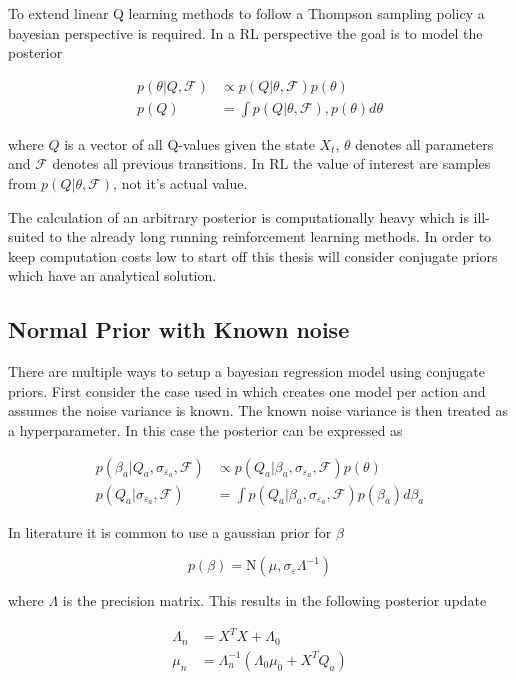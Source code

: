 To extend linear Q learning methods to follow a Thompson sampling policy a bayesian perspective is required. In a RL perspective the goal is to model the posterior

\begin{align*}
p(\theta |Q, \mathcal{F}) &\propto p(Q| \theta, \mathcal{F})p(\theta) \\
p(Q) &= \int p(Q|\theta, \mathcal{F}), p(\theta) d\theta
\end{align*}

where $Q$ is a vector of all Q-values given the state $X_t$, $\theta$ denotes all parameters and $\mathcal{F}$ denotes all previous transitions. In RL the value of interest are samples from $p(Q|\theta, \mathcal{F})$, not it's actual value.

The calculation of an arbitrary posterior is computationally heavy which is ill-suited to the already long running reinforcement learning methods. In order to keep computation costs low to start off this thesis will consider conjugate priors which have an analytical solution.

\subsection{Normal Prior with Known noise}

There are multiple ways to setup a bayesian regression model using conjugate priors. First consider the case used in \cite{azziz_2018} which creates one model per action and assumes the noise variance is known. The known noise variance is then treated as a hyperparameter. In this case the posterior can be expressed as 

\begin{align*}
    p(\beta_a |Q_a, \sigma_{\varepsilon_a}, \mathcal{F}) &\propto p(Q_a| \beta_a, \sigma_{\varepsilon_a}, \mathcal{F})p(\theta) \\
    p(Q_a|\sigma_{\varepsilon_a}, \mathcal{F}) &= \int p(Q_a|\beta_a, \sigma_{\varepsilon_a}, \mathcal{F}) p(\beta_a)d\beta_a
\end{align*}

In literature it is common to use a gaussian prior for $\beta$

$$
p(\beta) = \text{N}(\mu, \sigma_\varepsilon\Lambda^{-1}) 
$$

where $\Lambda$ is the precision matrix. This results in the following posterior update

\begin{align*}
	\Lambda_n & = X^TX + \Lambda_0 \\
	\mu_n     & = \Lambda_n^{-1}(\Lambda_0\mu_0 + X^TQ_a)
\end{align*}

